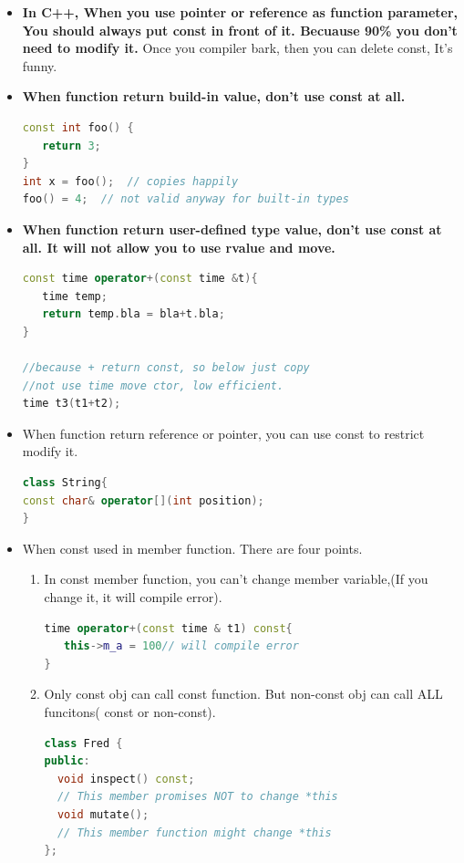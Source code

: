 \documentclass[a4paper,12pt,twoside]{book}
\begin{document}
\begin{itemize}
\item \textbf{In C++, When you use pointer or reference as function parameter, You should always put const in front of it. Becuause 90\% you don't need to modify it. }Once you compiler bark, then you can delete const, It's funny.

\item \textbf{When function return build-in value, don't use const at all. }
\begin{lstlisting}[frame=single, language=c++]
const int foo() {
   return 3;
}
int x = foo();  // copies happily
foo() = 4;  // not valid anyway for built-in types
\end{lstlisting}

\item \textbf{When function return user-defined type value, don't use const at all. It will not allow you to use rvalue and move. }
\begin{lstlisting}[frame=single, language=c++]
const time operator+(const time &t){
   time temp;
   return temp.bla = bla+t.bla;
}

//because + return const, so below just copy
//not use time move ctor, low efficient.
time t3(t1+t2);
\end{lstlisting}

\item When function return reference or pointer, you can use const to restrict modify it.
\begin{lstlisting}[frame=single, language=c++]
class String{
const char& operator[](int position);
}
\end{lstlisting}

\item When const used in member function. There are four points.
\begin{enumerate}
\item In const member function, you can't change member variable,(If you change it, it will compile error).
\begin{lstlisting}[frame=single, language=c++]
time operator+(const time & t1) const{
   this->m_a = 100// will compile error
}
\end{lstlisting}

\item Only const obj can call const function. But non-const obj can call ALL funcitons( const or non-const).
\begin{lstlisting}[frame=single, language=c++, mathescape=true]
class Fred {
public:
  void inspect() const;
  // This member promises NOT to change *this
  void mutate();
  // This member function might change *this
};


\end{lstlisting}
\end{enumerate}
\end{itemize}
\end{document}

